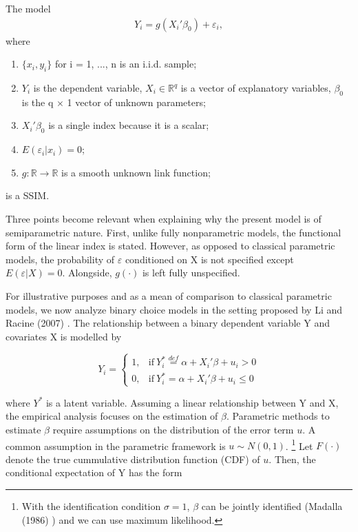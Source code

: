 \vspace{2mm} 
The model
\begin{eqnarray}
Y_i = g(X_i'\beta_0) + \varepsilon_i,
\end{eqnarray}
where
\begin{enumerate}[label=(\roman*)]
        \item $\{x_i,y_i\}$ for i = 1, ..., n is an i.i.d. sample;
        \item $Y_{i}$ is the dependent variable, $X_i \in \mathbb{R}^{q}$ is a vector of explanatory variables, $\beta_0$ is the q $\times$ 1 vector of unknown parameters; 
    \item $X_i'\beta_0$ is a single index because it is a scalar;
    \item $ E(\varepsilon_i|x_i) = 0 $;
    \item $g: \mathbb{R} \rightarrow \mathbb{R} $ is a smooth unknown link function; 
\end{enumerate}
is a SSIM.
\vspace{2mm}

Three points become relevant when explaining why the present model is of  semiparametric nature. First, unlike fully nonparametric models, the functional form of the linear index is stated. However, as opposed to classical parametric models, the probability of $\varepsilon$ conditioned on X is not specified except $ E(\varepsilon|X) = 0 $. Alongside, $g(\cdot)$ is left fully unspecified.

For illustrative purposes and as a mean of comparison to classical parametric models, we now analyze binary choice models in the setting proposed by Li and Racine (2007) \cite{[1]}. The relationship between a binary dependent variable Y and covariates X is modelled by

\[
    Y_i = 
    \begin{cases}
      1, & \text{if}\ Y_i^* \stackrel{def}{=} \alpha + X_i'\beta + u_i > 0 \\
      0, & \text{if}\ Y_i^* = \alpha + X_i'\beta + u_i \leq 0
    \end{cases}
\]

where $Y^{*}$ is a latent variable.
Assuming a linear relationship between Y and X, the empirical analysis focuses on the estimation of $\beta$.
Parametric methods to estimate $\beta$ require assumptions on the distribution of the error term $u$. A common assumption in the parametric framework is $ u \sim N(0, 1)$. \footnote{With the identification condition $\sigma = 1$, $\beta$ can be jointly identified (Madalla (1986) \cite{[2]}) and we can use maximum likelihood.}  Let $F(\cdot)$ denote the true cummulative distribution function (CDF) of $u$. Then, the conditional expectation of Y has the form

